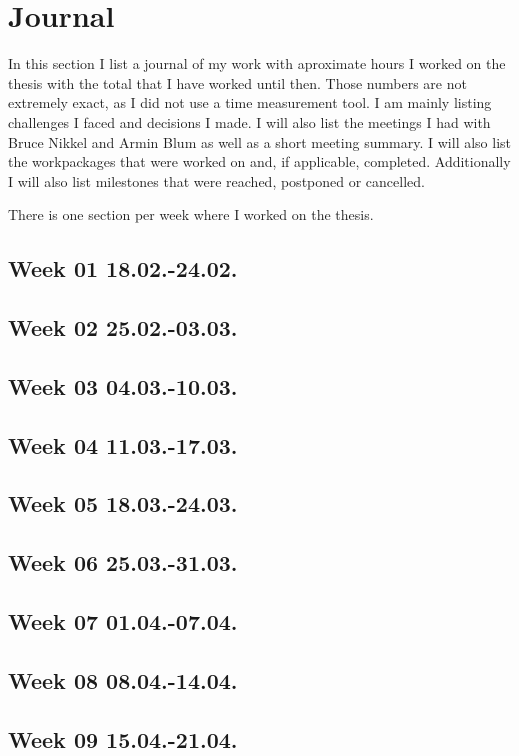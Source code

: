 \chapter{Journal}
\label{sec:journal}

In this section I list a journal of my work with aproximate hours I worked on the thesis with the total that I have worked until then. Those numbers are not extremely exact, as I did not use a time measurement tool. I am mainly listing challenges I faced and decisions I made. I will also list the meetings I had with Bruce Nikkel and Armin Blum as well as a short meeting summary. I will also list the workpackages that were worked on and, if applicable, completed. Additionally I will also list milestones that were reached, postponed or cancelled.

There is one section per week where I worked on the thesis.


\section{Week 01 18.02.-24.02.}


\section{Week 02 25.02.-03.03.}
\section{Week 03 04.03.-10.03.}
\section{Week 04 11.03.-17.03.}
\section{Week 05 18.03.-24.03.}
\section{Week 06 25.03.-31.03.}
\section{Week 07 01.04.-07.04.}
\section{Week 08 08.04.-14.04.}
\section{Week 09 15.04.-21.04.}
